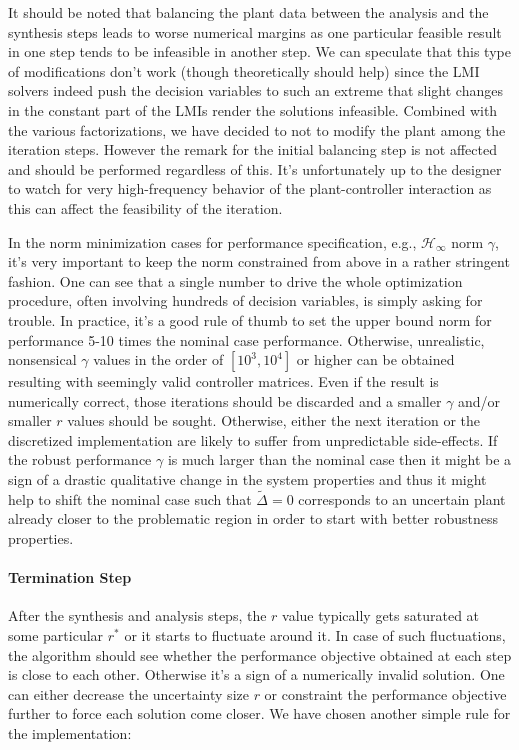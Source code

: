 \begin{rem} It should be noted that balancing the plant data between the analysis and the synthesis steps leads to 
worse numerical margins as one particular feasible result in one step tends to be infeasible in another step. We can speculate 
that this type of modifications don't work (though theoretically should help) since the LMI solvers indeed push the 
decision variables to such an extreme that slight changes in the constant part of the LMIs render the solutions 
infeasible. Combined with the various factorizations, we have decided to not to modify the plant among the 
iteration steps. However the remark for the initial balancing step is not affected and should be performed regardless 
of this. It's unfortunately up to the designer to watch for very high-frequency behavior of the plant-controller
interaction as this can affect the feasibility of the iteration. 
\end{rem}

\begin{rem} In the norm minimization cases for performance specification, e.g., $\mathcal{H}_\infty$ norm $\gamma$,
it's very important to keep the norm constrained from above in a  rather stringent fashion. One can see that a single
number to drive the whole optimization procedure, often involving hundreds of decision variables, is simply asking for 
trouble. In practice, it's a good rule of thumb to set the upper bound norm for performance 5-10 times the nominal case
performance. Otherwise, unrealistic, nonsensical $\gamma$ values in the order of $[10^3,10^4]$ or higher can be obtained
resulting with seemingly valid controller matrices. Even if the result is numerically correct, those iterations should be
discarded and a smaller $\gamma$ and/or smaller $r$ values should be sought. Otherwise, either the next iteration or the
discretized implementation are likely to suffer from unpredictable side-effects. If the robust performance $\gamma$ is 
much larger than the nominal case then it might be a sign of a drastic qualitative change in the system properties and 
thus it might help to shift the nominal case such that $\tilde{\Delta}=0$ corresponds to an uncertain plant already 
closer to the problematic region in order to start with better robustness properties. 
\end{rem}


\paragraph{Termination Step} After the synthesis and analysis steps, the $r$ value typically gets saturated at some 
particular $r^*$ or it starts to fluctuate around it. In case of such fluctuations, the algorithm should see whether
the performance objective obtained at each step is close to each other. Otherwise it's a sign of a numerically invalid
solution. One can either decrease the uncertainty size $r$ or constraint the performance objective further to force 
each solution come closer. We have chosen another simple rule for the implementation:

